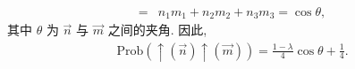 \documentclass{assignment}
\begin{document}
\begin{sol}
\begin{itemize}
\begin{align}
            =&n_1m_1+n_2m_2+n_3m_3=\cos\theta,
        \end{align}
        其中 $\theta$ 为 $\vec{n}$ 与 $\vec{m}$ 之间的夹角.
        因此,
        \begin{align}
            \text{Prob}(\uparrow(\vec{n})\uparrow(\vec{m}))=\frac{1-\lambda}{4}\cos\theta+\frac{1}{4}.
        \end{align}
    \end{itemize}
\end{sol}
\end{document}
